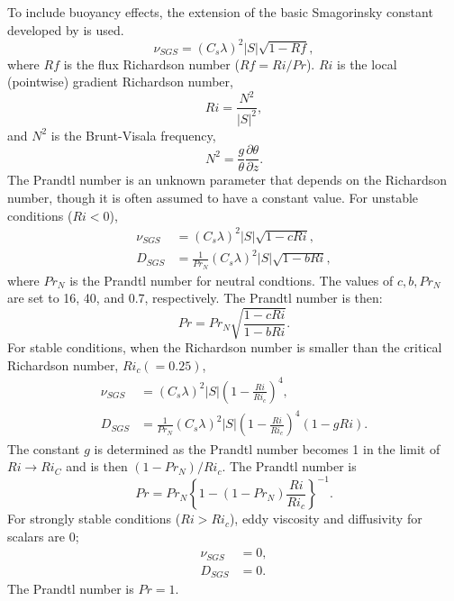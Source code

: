 To include buoyancy effects, the extension of the basic Smagorinsky constant developed by \citet{Brown_etal_1994}
is used.
\begin{equation}
  \nu_{SGS} = (C_s\lambda)^2 |S| \sqrt{1-Rf},
\end{equation}
where $Rf$ is the flux Richardson number ($Rf = Ri/Pr$).
$Ri$ is the local (pointwise) gradient Richardson number,
\begin{equation}
  Ri = \frac{N^2}{|S|^2},
  \label{eq:Ri}
\end{equation}
and $N^2$ is the Brunt-Visala frequency,
\begin{equation}
  N^2 = \frac{g}{\theta}\frac{\partial\theta}{\partial z}.
  \label{eq:N^2}
\end{equation}
The Prandtl number is an unknown parameter that depends on the Richardson number,
though it is often assumed to have a constant value.
For  unstable conditions ($Ri < 0$),
\begin{align}
  \nu_{SGS} &= \left(C_s\lambda\right)^2 |S| \sqrt{1 - c Ri}, \label{eq:nu unstable} \\
  D_{SGS} &= \frac{1}{Pr_N} \left(C_s\lambda\right)^2 |S| \sqrt{1 - b Ri} \label{eq:nu^* unstable},
\end{align}
where $Pr_N$ is the Prandtl number for neutral condtions.
The values of $c, b, Pr_N$ are set to 16, 40, and 0.7, respectively.
The Prandtl number is then:
\begin{equation}
  Pr = Pr_N \sqrt{\frac{1-c Ri}{1-b Ri}}.
\end{equation}
For stable conditions, when the Richardson number is smaller than the critical Richardson number, $Ri_c (=0.25)$,
\begin{align}
  \nu_{SGS} &= \left(C_s\lambda\right)^2 |S| \left(1-\frac{Ri}{Ri_c}\right)^4, \label{eq:nu stable} \\
  D_{SGS} &= \frac{1}{Pr_N}\left(C_s\lambda\right)^2 |S| \left(1-\frac{Ri}{Ri_c}\right)^4\left(1-g Ri\right). \label{eq:nu^* stable}
\end{align}
The constant $g$ is determined as the Prandtl number becomes 1
in the limit of $Ri \to Ri_C$ and is then $(1-Pr_N)/Ri_c$.
The Prandtl number is
\begin{equation}
  Pr = Pr_N \left\{1-(1-Pr_N)\frac{Ri}{Ri_c}\right\}^{-1}.
\end{equation}
For  strongly stable conditions ($Ri > Ri_c$), eddy viscosity and diffusivity for scalars are 0;
\begin{align}
  \nu_{SGS} &= 0, \label{eq:nu strong stable} \\
  D_{SGS} &= 0. \label{eq:nu^* strong stable}
\end{align}
The Prandtl number is $Pr = 1$.


